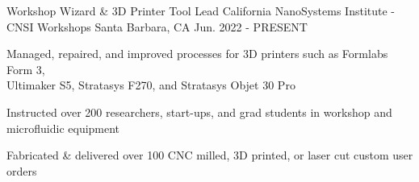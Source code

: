 \begin{cventries}

\cventry
{Workshop Wizard \& 3D Printer Tool Lead} %
{California NanoSystems Institute - CNSI Workshops} %
{Santa Barbara, CA} %
{Jun. 2022 - PRESENT} %
{ %
\begin{cvitems}
\item {Managed, repaired, and improved processes for 3D printers such as Formlabs Form 3, \\ Ultimaker S5, Stratasys F270, and Stratasys Objet 30 Pro}
\item {Instructed over 200 researchers, start-ups, and grad students in workshop and microfluidic equipment}
\item {Fabricated \& delivered over 100 CNC milled, 3D printed, or laser cut custom user orders }
\end{cvitems}
}








\end{cventries}
